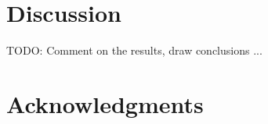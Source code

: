 \documentclass[fleqn,moreauthors,10pt]{ds_report}
\begin{document}




\section{Discussion}
\par TODO: Comment on the results, draw conclusions ...




\section{Acknowledgments}





\end{document}
